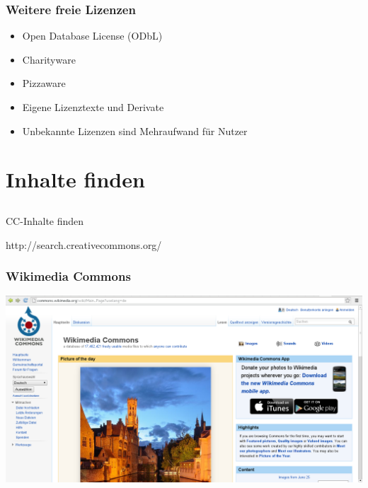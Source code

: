 \documentclass[table]{beamer}
\begin{document}
\begin{frame}
    \frametitle{Weitere freie Lizenzen}
    \begin{itemize}
        \item<2-> Open Database License (ODbL)
        \item<3-> Charityware
        \item<4-> Pizzaware
        \item<5-> Eigene Lizenztexte und Derivate
        \item<6-> Unbekannte Lizenzen sind Mehraufwand für Nutzer
    \end{itemize}
\end{frame}

\section{Inhalte finden}
\subsection{}

\begin{frame}
    \begin{center}\Large
    CC-Inhalte finden
    \end {center}
\end{frame}

\begin{frame}
    \begin{center}\Large
      http://search.creativecommons.org/
    \end {center}
\end{frame}

\begin{frame}
  \frametitle{Wikimedia Commons}
  \includegraphics[width=\textwidth]{img/wikicommons.png}
\end{frame}
\end{document}
